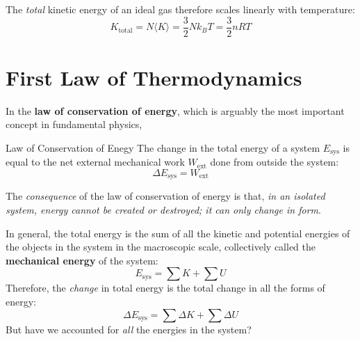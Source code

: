 The \emph{total} kinetic energy of an ideal gas therefore scales linearly
with temperature:
\begin{equation}
  K_\text{total}=N\langle K\rangle=\frac32Nk_BT=\frac32nRT
\end{equation}




\section{First Law of Thermodynamics}

In the \textbf{law of conservation of energy}, which is arguably the most
important concept in fundamental physics,


\begin{definition}{Law of Conservation of Enegy}
  The change in the total energy of a system $E_\text{sys}$ is equal to the net
  external mechanical work $W_\text{ext}$ done from outside the system:
  \begin{equation}
    \boxed{
      \Delta E_\text{sys}=W_\text{ext}
    }
  \end{equation}
\end{definition}
The \emph{consequence} of the law of conservation of energy is that,
\emph{in an isolated system, energy cannot be created or destroyed; it can only
change in form}.

In general, the total energy is the sum of all the kinetic and potential
energies of the objects in the system in the macroscopic scale, collectively
called the \textbf{mechanical energy} of the system:
\begin{equation}
  E_\text{sys} = \sum K + \sum U
\end{equation}
Therefore, the \emph{change} in total energy is the total change in all the
forms of energy:
\begin{equation}
  \Delta E_\text{sys} = \sum\Delta K + \sum\Delta U
\end{equation}
But have we accounted for \emph{all} the energies in the system?

